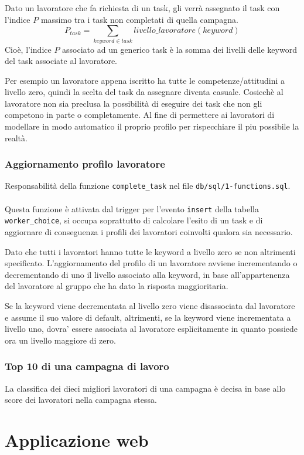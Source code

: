 \documentclass[a4paper]{article}
\begin{document}
Dato un lavoratore che fa richiesta di un task, gli verr\`a assegnato il task con l'indice $P$ massimo tra i task non completati di quella campagna.
$$
P_{task} = \sum_{keyword \in task}{livello\_lavoratore(keyword)}
$$
Cio\`e, l'indice $P$ associato ad un generico task \`e la somma dei livelli delle keyword del task associate al lavoratore.

Per esempio un lavoratore appena iscritto ha tutte le competenze/attitudini a livello zero, quindi la scelta del task da assegnare diventa casuale.
Cosicch\`e al lavoratore non sia preclusa la possibilit\`a di eseguire dei task che non gli competono in parte o completamente. Al fine di permettere ai lavoratori di modellare in modo automatico il proprio profilo per rispecchiare il piu possibile la realt\`a.

\subsubsection{Aggiornamento profilo lavoratore}
Responsabilit\`{a} della funzione \verb|complete_task| nel file \verb|db/sql/1-functions.sql|.
\\\\
Questa funzione \`e attivata dal trigger per l'evento \verb|insert| della tabella \verb|worker_choice|, si occupa soprattutto di calcolare l'esito di un task e di aggiornare di conseguenza i profili dei lavoratori coinvolti qualora sia necessario.

Dato che tutti i lavoratori hanno tutte le keyword a livello zero se non altrimenti specificato.
L'aggiornamento del profilo di un lavoratore avviene incrementando o decrementando di uno il livello associato alla keyword, in base all'appartenenza del lavoratore al gruppo che ha dato la risposta maggioritaria.

Se la keyword viene decrementata al livello zero viene disassociata dal lavoratore e assume il suo valore di default, altrimenti, se la keyword viene incrementata a livello uno, dovra' essere associata al lavoratore esplicitamente in quanto possiede ora un livello maggiore di zero.

\subsubsection{Top 10 di una campagna di lavoro}
La classifica dei dieci migliori lavoratori di una campagna \`e decisa in base allo score dei lavoratori nella campagna stessa.

\section{Applicazione web}
\end{document}
